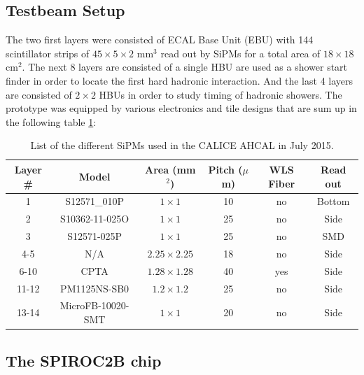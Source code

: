 \documentclass[twoside,a4paper,11pt]{article}
\begin{document}
\subsection{Testbeam Setup}

The two first layers were consisted of ECAL Base Unit (EBU) with 144 scintillator strips of $45\times5\times2$ mm$^3$ read out by SiPMs for a total area of $18\times18$ cm$^2$. The next 8 layers are consisted of a single HBU are used as a shower start finder in order to locate the first hard hadronic interaction. And the last 4 layers are consisted of $2\times2$ HBUs in order to study timing of hadronic showers. The prototype was equipped by various electronics and tile designs that are sum up in the following table \ref{table:sipm_list}:
\begin{table}[htbp]
\centering
    \begin{tabular}{@{} cccccc @{}}
    \hline
    Layer \# & Model & Area (mm$^2$) & Pitch ($\mu$m) & WLS Fiber & Read out \\ \hline
    1 & S12571\_010P & $1\times1$ & 10 & no & Bottom \\ 
    2 & S10362-11-025O & $1\times1$ & 25 & no & Side \\
    3 & S12571-025P & $1\times1$ & 25 & no & SMD \\ 
    4-5 & N/A & $2.25\times2.25$ & 18 & no & Side \\
    6-10 & CPTA & $1.28\times1.28$ & 40 & yes & Side \\ 
    11-12 & PM1125NS-SB0 & $1.2\times1.2$ & 25 & no & Side \\
    13-14 & MicroFB-10020-SMT & $1\times1$ & 20 & no & Side \\
    \hline
    \end{tabular}
     \caption{List of the different SiPMs used in the CALICE AHCAL in July 2015.}
     \label{table:sipm_list}
\end{table}
\subsection{The SPIROC2B chip}
\end{document}
